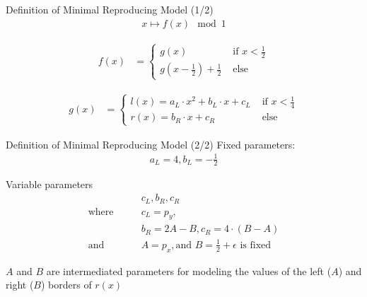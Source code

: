 \begin{frame}{Definition of Minimal Reproducing Model (1/2)}
    \vspace{-3.0em}
    \begin{align}
        x \mapsto f(x) \mod 1
    \end{align}

    \begin{align}
        f(x) & = \begin{cases}
                     g(x)                                        & \text{ if } x < \frac{1}{2} \\
                     g\left(x - \frac{1}{2}\right) + \frac{1}{2} & \text{ else}
                 \end{cases}
    \end{align}

    \begin{align}
        g(x) & = \begin{cases}
                     l(x) = a_L \cdot x^2 + b_L \cdot x + c_L & \text{ if } x < \frac{1}{4} \\
                     r(x) = b_R \cdot x + c_R                 & \text{ else}
                 \end{cases}
    \end{align}
\end{frame}

\begin{frame}{Definition of Minimal Reproducing Model (2/2)}
    Fixed parameters:
    \begin{align*}
        a_L = 4, b_L = -\frac{1}{2}
    \end{align*}

    Variable parameters
    \begin{align*}
         & c_L, b_R, c_R                                                    \\
        \text{where} \qquad
         & c_L = p_y,                                                       \\
         & b_R = 2A - B, c_R = 4 \cdot (B - A)                              \\
        \text {and} \qquad
         & A = p_x, \text{and } B = \frac{1}{2} + \epsilon \text{ is fixed}
    \end{align*}

    $A$ and $B$ are intermediated parameters for modeling the values of the left ($A$) and right ($B$) borders of $r(x)$
\end{frame}

